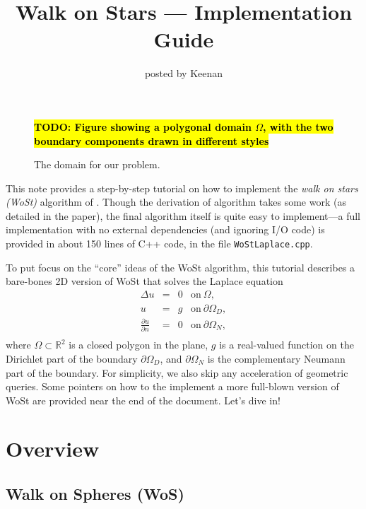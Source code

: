 \documentclass{article}
\title{Walk on Stars --- Implementation Guide}
\author{posted by Keenan}
\newcommand{\code}[1]{\texttt{#1}}
\newcommand{\todo}[1]{\textbf{\hl{TODO: #1}}}
\begin{document}
\maketitle

\begin{figure}[h!]
   \todo{Figure showing a polygonal domain $\Omega$, with the two boundary components drawn in different styles}
   \caption{The domain for our problem.\label{fig:ProblemDomain}}
\end{figure}

This note provides a step-by-step tutorial on how to implement the \emph{walk on stars (WoSt)} algorithm of \citet{Sawhney:2023:WoSt}.  Though the derivation of algorithm takes some work (as detailed in the paper), the final algorithm itself is quite easy to implement---a full implementation with no external dependencies (and ignoring I/O code) is provided in about 150 lines of C++ code, in the file \code{WoStLaplace.cpp}.

To put focus on the ``core'' ideas of the WoSt algorithm, this tutorial describes a bare-bones 2D version of WoSt that solves the Laplace equation
\[
   \begin{array}{rcll}
      \Delta u &=& 0 & \text{on}\ \Omega, \\
             u &=& g & \text{on}\ \partial\Omega_D, \\
             \tfrac{\partial u}{\partial n} &=& 0 & \text{on}\ \partial\Omega_N, \\
   \end{array}
\]
where \(\Omega \subset \mathbb{R}^2\) is a closed polygon in the plane, \(g\) is a real-valued function on the Dirichlet part of the boundary \(\partial\Omega_D\), and \(\partial\Omega_N\) is the complementary Neumann part of the boundary.  For simplicity, we also skip any acceleration of geometric queries.  Some pointers on how to the implement a more full-blown version of WoSt are provided near the end of the document.  Let's dive in!

\section{Overview}
\label{sec:Overview}

\subsection{Walk on Spheres (WoS)}
\label{sec:WalkOnSpheresOverview}
\end{document}
